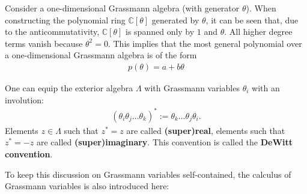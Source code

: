     \begin{property}
        Consider a one-dimensional Grassmann algebra (with generator $\theta$). When constructing the polynomial ring $\mathbb{C}[\theta]$ generated by $\theta$, it can be seen that, due to the anticommutativity, $\mathbb{C}[\theta]$ is spanned only by $1$ and $\theta$. All higher degree terms vanish because $\theta^2 = 0$. This implies that the most general polynomial over a one-dimensional Grassmann algebra is of the form
        \begin{gather}
            p(\theta) = a + b\theta
        \end{gather}
    \end{property}

    \begin{definition}
        One can equip the exterior algebra $\Lambda$ with Grassmann variables $\theta_i$ with an involution:
        \begin{gather}
            (\theta_i\theta_j\ldots\theta_k)^* := \theta_k\ldots\theta_j\theta_i.
        \end{gather}
        Elements $z\in\Lambda$ such that $z^* = z$ are called \textbf{(super)real}, elements such that $z^* = -z$ are called \textbf{(super)imaginary}. This convention is called the \textbf{DeWitt convention}.
    \end{definition}

    To keep this discussion on Grassmann variables self-contained, the calculus of Grassmann variables is also introduced here:

